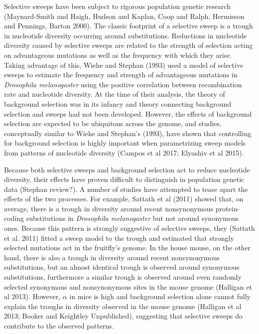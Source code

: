 \documentclass[11pt]{article}
\begin{document}
Selective sweeps have been subject to rigorous population genetic research (Maynard-Smith and Haigh, Hudson and Kaplan, Coop and Ralph, Hermisson and Pennings, Barton 2000). The classic footprint of a selective sweep is a trough in nucleotide diversity occurring around substitutions. Reductions in nucleotide diversity caused by selective sweeps are related to the strength of selection acting on advantageous mutations as well as the frequency with which they arise. Taking advantage of this, Wiehe and Stephan (1993) used a model of selective sweeps to estimate the frequency and strength of advantageous mutations in \textit{Drosophila melanogaster} using the positive correlation between recombination rate and nucleotide diversity. At the time of their analysis, the theory of background selection was in its infancy and theory connecting background selection and sweeps had not been developed. However, the effects of background selection are expected to be ubiquitous across the genome, and studies, conceptually similar to Wiehe and Stephan's (1993), have shown that controlling for background selection is highly important when parametrizing sweep models from patterns of nucleotide diversity (Campos et al 2017; Elyashiv et al 2015).

Because both selective sweeps and background selection act to reduce nucleotide diversity, their effects have proven difficult to distinguish in  population genetic data (Stephan review?). A number of studies have attempted to tease apart the effects of the two processes. For example, Sattath et al (2011) showed that, on average, there is a trough in diversity around recent nonsynonymous protein-coding substitutions in \textit{Drosophila melanogaster} but not around synonymous ones. Because this pattern is strongly suggestive of selective sweeps, they (Sattath et al. 2011) fitted a sweep model to the trough and estimated that strongly selected mutations act in the fruitfly's genome.  In the house mouse, on the other hand, there is also a trough in diversity around recent nonsynonymous substitutions, but an almost identical trough is observed around synonymous substitutions, furthermore a similar trough is observed around even randomly selected synonymous and nonsynonymous sites in the mouse genome (Halligan et al 2013). However, $\alpha$ in mice is high and background selection alone cannot fully explain the troughs in diversity observed in the mouse genome (Halligan et al 2013; Booker and Keightley Unpublished), suggesting that selective sweeps do contribute to the observed patterns. 
\end{document}
